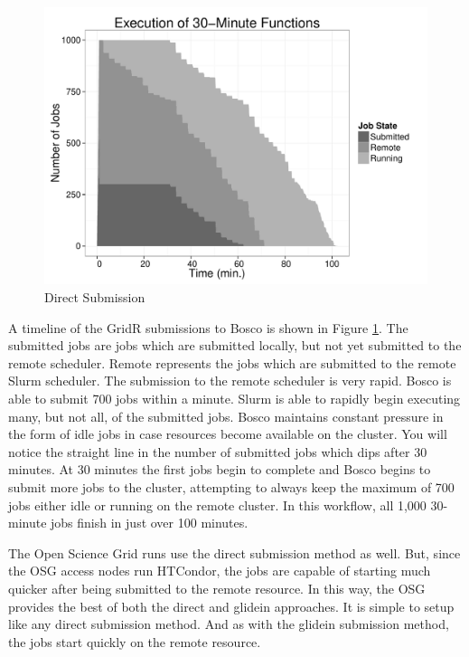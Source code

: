 \begin{figure}[h!t]
\centering
\includegraphics[width=\textwidth]{BoscoRImages/30minplot-color.pdf}

\caption{Direct Submission}
\label{fig:directsubmit}
\end{figure}

A timeline of the GridR submissions to Bosco is shown in Figure \ref{fig:directsubmit}.  The submitted jobs are jobs which are submitted locally, but not yet submitted to the remote scheduler.  Remote represents the jobs which are submitted to the remote Slurm scheduler.  The submission to the remote scheduler is very rapid.  Bosco is able to submit 700 jobs within a minute.  Slurm is able to rapidly begin executing many, but not all, of the submitted jobs.  Bosco maintains constant pressure in the form of idle jobs in case resources become available on the cluster.  You will notice the straight line in the number of submitted jobs which dips after 30 minutes.  At 30 minutes the first jobs begin to complete and Bosco begins to submit more jobs to the cluster, attempting to always keep the maximum of 700 jobs either idle or running on the remote cluster.  In this workflow, all 1,000 30-minute jobs finish in just over 100 minutes.

The Open Science Grid runs use the direct submission method as well.  But, since the OSG access nodes run HTCondor, the jobs are capable of starting much quicker after being submitted to the remote resource.  In this way, the OSG provides the best of both the direct and glidein approaches.  It is simple to setup like any direct submission method.  And as with the glidein submission method, the jobs start quickly on the remote resource.


